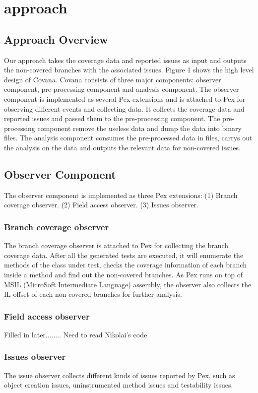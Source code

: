 \section{approach}
\subsection{Approach Overview}
Our approach takes the coverage data and reported issues as input and outputs the non-covered branches with the associated issues. Figure 1 shows the high level design of Covana. Covana consists of three major components: observer component, pre-processing component and analysis component.
The observer component is implemented as several Pex extensions and is attached to Pex for observing different events and collecting data. It collects the coverage data and reported issues and passed them to the pre-processing component. The pre-processing component remove the useless data and dump the data into binary files. The analysis component consumes the pre-processed data in files, carrys out the analysis on the data and outputs the relevant data for non-covered issues.
\subsection{Observer Component}
The observer component is implemented as three Pex extensions: (1) Branch coverage observer. (2) Field access observer. (3) Issues observer.
\subsubsection{Branch coverage observer}
The branch coverage observer is attached to Pex for collecting the branch coverage data. After all the generated tests are executed, it will enumerate the methods of the class under test, checks the coverage information of each branch inside a method and find out the non-covered branches. As Pex runs on top of MSIL (MicroSoft Intermediate Language) assembly, the observer also collects the IL offset of each non-covered branches for further analysis.
\subsubsection{Field access observer}
Filled in later........ Need to read Nikolai's code
\subsubsection{Issues observer}
The issue observer collects different kinds of issues reported by Pex, such as object creation issues, uninstrumented method issues and testability issues.
